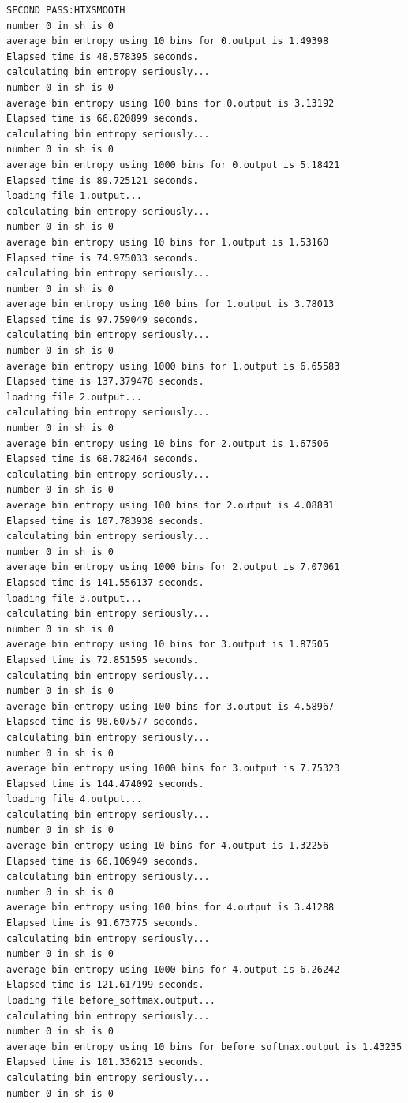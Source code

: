 \documentclass[11pt]{article}
\begin{document}
\begin{verbatim}
SECOND PASS:HTXSMOOTH
number 0 in sh is 0
average bin entropy using 10 bins for 0.output is 1.49398
Elapsed time is 48.578395 seconds.
calculating bin entropy seriously...
number 0 in sh is 0
average bin entropy using 100 bins for 0.output is 3.13192
Elapsed time is 66.820899 seconds.
calculating bin entropy seriously...
number 0 in sh is 0
average bin entropy using 1000 bins for 0.output is 5.18421
Elapsed time is 89.725121 seconds.
loading file 1.output...
calculating bin entropy seriously...
number 0 in sh is 0
average bin entropy using 10 bins for 1.output is 1.53160
Elapsed time is 74.975033 seconds.
calculating bin entropy seriously...
number 0 in sh is 0
average bin entropy using 100 bins for 1.output is 3.78013
Elapsed time is 97.759049 seconds.
calculating bin entropy seriously...
number 0 in sh is 0
average bin entropy using 1000 bins for 1.output is 6.65583
Elapsed time is 137.379478 seconds.
loading file 2.output...
calculating bin entropy seriously...
number 0 in sh is 0
average bin entropy using 10 bins for 2.output is 1.67506
Elapsed time is 68.782464 seconds.
calculating bin entropy seriously...
number 0 in sh is 0
average bin entropy using 100 bins for 2.output is 4.08831
Elapsed time is 107.783938 seconds.
calculating bin entropy seriously...
number 0 in sh is 0
average bin entropy using 1000 bins for 2.output is 7.07061
Elapsed time is 141.556137 seconds.
loading file 3.output...
calculating bin entropy seriously...
number 0 in sh is 0
average bin entropy using 10 bins for 3.output is 1.87505
Elapsed time is 72.851595 seconds.
calculating bin entropy seriously...
number 0 in sh is 0
average bin entropy using 100 bins for 3.output is 4.58967
Elapsed time is 98.607577 seconds.
calculating bin entropy seriously...
number 0 in sh is 0
average bin entropy using 1000 bins for 3.output is 7.75323
Elapsed time is 144.474092 seconds.
loading file 4.output...
calculating bin entropy seriously...
number 0 in sh is 0
average bin entropy using 10 bins for 4.output is 1.32256
Elapsed time is 66.106949 seconds.
calculating bin entropy seriously...
number 0 in sh is 0
average bin entropy using 100 bins for 4.output is 3.41288
Elapsed time is 91.673775 seconds.
calculating bin entropy seriously...
number 0 in sh is 0
average bin entropy using 1000 bins for 4.output is 6.26242
Elapsed time is 121.617199 seconds.
loading file before_softmax.output...
calculating bin entropy seriously...
number 0 in sh is 0
average bin entropy using 10 bins for before_softmax.output is 1.43235
Elapsed time is 101.336213 seconds.
calculating bin entropy seriously...
number 0 in sh is 0

\end{verbatim}
\end{document}
